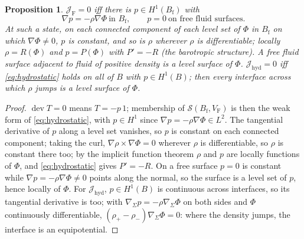 \documentclass[11pt]{article}
\newtheorem{proposition}{Proposition}
\newcommand{\Jf}{\mathscr{J}}  %
\newcommand{\Bf}{B_{\mathrm{f}}}
\newcommand{\dev}{\operatorname{dev}}
\newcommand{\JF}{\Jf _{\mathrm{F}}}
\newcommand{\Jh}{\Jf _{\mathrm{hyd}}}
\begin{document}
\begin{proposition}\label{prop:barotropic}
$\JF = 0$ iff there is $p \in H^{1}(\Bf)$ with
\begin{equation}
  \nabla p = -\rho\nabla\Phi \ \text{in } \Bf,
  \qquad p = 0 \ \text{on free fluid surfaces}.
  \label{eq:hydrostatic}
\end{equation}
At such a state, on each connected component of each level set of
$\Phi$ in $\Bf$ on which $\nabla\Phi \ne 0$, $p$ is constant, and so
is $\rho$ wherever $\rho$ is differentiable; locally $\rho = R(\Phi)$
and $p = P(\Phi)$ with $P' = -R$ (the barotropic structure). A free
fluid surface adjacent to fluid of positive density is a level surface
of $\Phi$. $\Jh = 0$ iff \eqref{eq:hydrostatic} holds on all of $B$ with
$p \in H^1(B)$; then every interface across which $\rho$ jumps is a
level surface of $\Phi$.
\end{proposition}
\begin{proof}
$\dev T = 0$ means $T = -p\,1$; membership of $\mathcal{S}(\Bf,
V_{\mathrm{F}})$ is then the weak form of \eqref{eq:hydrostatic}, with
$p\in H^1$ since $\nabla p = -\rho\nabla\Phi \in L^2$. The tangential
derivative of $p$ along a level set vanishes, so $p$ is constant on each
connected component; taking the curl, $\nabla\rho\times\nabla\Phi = 0$
wherever $\rho$ is differentiable, so $\rho$ is constant there too; by
the implicit function theorem $\rho$ and $p$ are locally functions of
$\Phi$, and \eqref{eq:hydrostatic} gives $P' = -R$. On a free surface
$p = 0$ is constant while $\nabla p = -\rho\nabla\Phi \ne 0$ points
along the normal, so the surface is a level set of $p$, hence locally of
$\Phi$. For $\Jh$, $p \in H^1(B)$ is continuous across interfaces, so
its tangential derivative is too; with
$\nabla_\Sigma p = -\rho\nabla_\Sigma\Phi$ on both sides and $\Phi$
continuously differentiable, $(\rho_+ - \rho_-)\nabla_\Sigma\Phi = 0$:
where the density jumps, the interface is an equipotential.
\end{proof}
\end{document}
